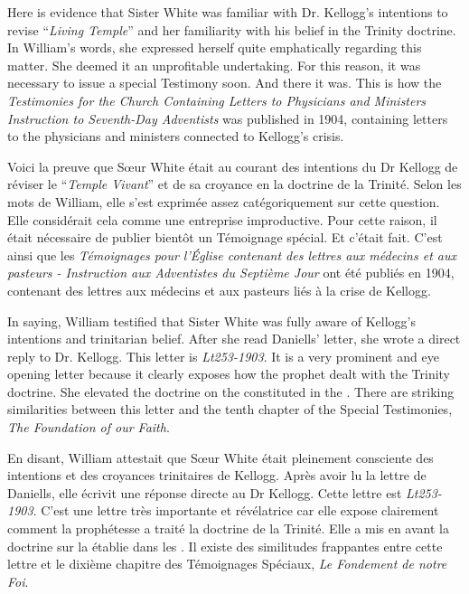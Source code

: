 Here is evidence that Sister White was familiar with Dr. Kellogg's intentions to revise “\textit{Living Temple}” and her familiarity with his belief in the Trinity doctrine. In William's words, she expressed herself quite emphatically regarding this matter. She deemed it an unprofitable undertaking. For this reason, it was necessary to issue a special Testimony soon. And there it was. This is how the \textit{Testimonies for the Church Containing Letters to Physicians and Ministers Instruction to Seventh-Day Adventists} was published in 1904, containing letters to the physicians and ministers connected to Kellogg's crisis.


Voici la preuve que Sœur White était au courant des intentions du Dr Kellogg de réviser le “\textit{Temple Vivant}” et de sa croyance en la doctrine de la Trinité. Selon les mots de William, elle s'est exprimée assez catégoriquement sur cette question. Elle considérait cela comme une entreprise improductive. Pour cette raison, il était nécessaire de publier bientôt un Témoignage spécial. Et c'était fait. C'est ainsi que les \textit{Témoignages pour l'Église contenant des lettres aux médecins et aux pasteurs - Instruction aux Adventistes du Septième Jour} ont été publiés en 1904, contenant des lettres aux médecins et aux pasteurs liés à la crise de Kellogg.


In saying, William testified that Sister White was fully aware of Kellogg's intentions and trinitarian belief. After she read Daniells’ letter, she wrote a direct reply to Dr. Kellogg. This letter is \textit{Lt253-1903}. It is a very prominent and eye opening letter because it clearly exposes how the prophet dealt with the Trinity doctrine. She elevated the doctrine on the  constituted in the . There are striking similarities between this letter and the tenth chapter of the Special Testimonies, \textit{The Foundation of our Faith}.


En disant, William attestait que Sœur White était pleinement consciente des intentions et des croyances trinitaires de Kellogg. Après avoir lu la lettre de Daniells, elle écrivit une réponse directe au Dr Kellogg. Cette lettre est \textit{Lt253-1903}. C'est une lettre très importante et révélatrice car elle expose clairement comment la prophétesse a traité la doctrine de la Trinité. Elle a mis en avant la doctrine sur la  établie dans les . Il existe des similitudes frappantes entre cette lettre et le dixième chapitre des Témoignages Spéciaux, \textit{Le Fondement de notre Foi}.

